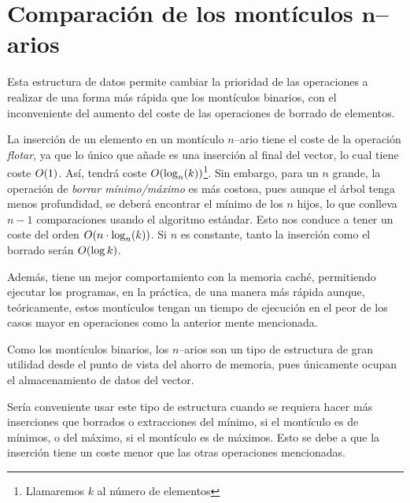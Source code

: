 \chapter{Comparación de los montículos $\boldsymbol{n}$--arios}

Esta estructura de datos permite cambiar la prioridad de las operaciones a realizar de una forma más rápida que los montículos binarios, con el inconveniente del aumento del coste de las operaciones de borrado de elementos.
\newline

La inserción de un elemento en un montículo $n$--ario tiene el coste de la operación \textit{flotar}, ya que lo único que añade es una inserción al final del vector, lo cual tiene coste $O(1)$. Así, tendrá coste $O(\log_n(k))$\footnote{Llamaremos $k$ al número de elementos}. Sin embargo, para un $n$ grande, la operación de \textit{borrar mínimo/máximo} es más costosa, pues aunque el árbol tenga menos profundidad, se deberá encontrar el mínimo de los $n$ hijos, lo que conlleva $n - 1$ comparaciones usando el algoritmo estándar. Esto nos conduce a tener un coste del orden $O(n\cdot\log_n(k))$. Si $n$ es constante, tanto la inserción como el borrado serán  $O(\log k)$.\newline

Además, tiene un mejor comportamiento con la memoria caché, permitiendo ejecutar los programas, en la práctica, de una manera más rápida aunque, teóricamente, estos montículos tengan un tiempo de ejecución en el peor de los casos mayor en operaciones como la anterior mente mencionada.
\newline

Como los montículos binarios, los $n$--arios son un tipo de estructura de gran utilidad desde el punto de vista del ahorro de memoria, pues únicamente ocupan el almacenamiento de datos del vector.
\newline

Sería conveniente usar este tipo de estructura cuando se requiera hacer más inserciones que borrados o extracciones del mínimo, si el montículo es de mínimos, o del máximo, si el montículo es de máximos. Esto se debe a que la inserción tiene un coste menor que las otras operaciones mencionadas.
\newline 

